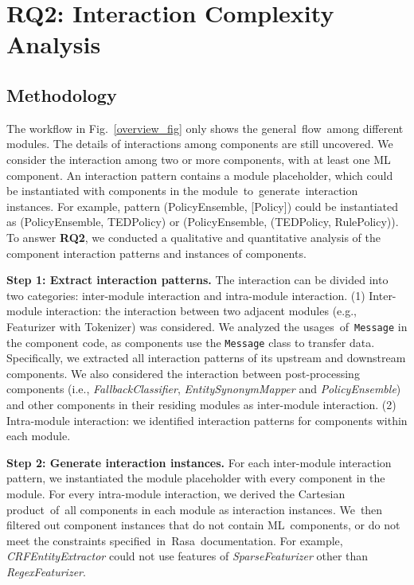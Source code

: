 
\section{RQ2: Interaction Complexity Analysis}
\vspace{-3pt}
\subsection{Methodology}

The workflow in Fig.~\ref{overview_fig} only shows the general~flow~among different modules. The details of interactions among components are still uncovered. We consider the interaction among two or more components, with at least one ML component.
An interaction pattern contains a module placeholder, which could be instantiated with components in the module~to~generate~interaction instances.
For example, pattern (PolicyEnsemble, [Policy]) could be instantiated as (PolicyEnsemble, TEDPolicy) or (PolicyEnsemble, (TEDPolicy, RulePolicy)). To answer \textbf{RQ2}, we conducted a qualitative and quantitative analysis of the component interaction patterns and instances of components.

\textbf{Step 1: Extract interaction patterns.}
The interaction can be divided into two categories: inter-module interaction and intra-module interaction.
(1) Inter-module interaction: the interaction between two adjacent modules (e.g., Featurizer with Tokenizer) was considered. We analyzed the usages~of~\texttt{Message} in the component code, as components use the \texttt{Message} class to transfer data. Specifically, we extracted all interaction patterns of its upstream and downstream components. We also considered the interaction between post-processing components (i.e., \textit{FallbackClassifier}, \textit{EntitySynonymMapper} and \textit{PolicyEnsemble}) and other components in their residing modules as inter-module interaction.
(2) Intra-module interaction: we identified interaction patterns for components within each module.

\textbf{Step 2: Generate interaction instances.}
For each inter-module interaction pattern, we instantiated the module placeholder with every component in the module. 
For every intra-module interaction, we derived the Cartesian product~of~all components in each module as interaction instances.
We~then filtered out component instances that do not contain ML~components, or do not meet the constraints specified~in~Rasa~documentation. 
For example, \textit{CRFEntityExtractor} could not use features of \textit{SparseFeaturizer} other than \textit{RegexFeaturizer}.

